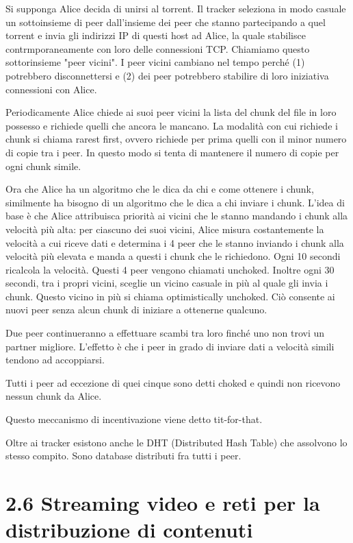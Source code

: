 \documentclass{book}
\begin{document}
Si supponga Alice decida di unirsi al torrent. Il tracker seleziona in modo casuale un sottoinsieme di peer dall'insieme dei peer che stanno partecipando a quel torrent e invia gli indirizzi IP di questi host ad Alice, la quale stabilisce contrmporaneamente con loro delle connessioni TCP. Chiamiamo questo sottorinsieme "peer vicini". I peer vicini cambiano nel tempo perché (1) potrebbero disconnettersi e (2) dei peer potrebbero stabilire di loro iniziativa connessioni con Alice.

Periodicamente Alice chiede ai suoi peer vicini la lista del chunk del file in loro possesso e richiede quelli che ancora le mancano. La modalità con cui richiede i chunk si chiama rarest first, ovvero richiede per prima quelli con il minor numero di copie tra i peer. In questo modo si tenta di mantenere il numero di copie per ogni chunk simile.

Ora che Alice ha un algoritmo che le dica da chi e come ottenere i chunk, similmente ha bisogno di un algoritmo che le dica a chi inviare i chunk. L'idea di base è che Alice attribuisca priorità ai vicini che le stanno mandando i chunk alla velocità più alta: per ciascuno dei suoi vicini, Alice misura costantemente la velocità a cui riceve dati e determina i 4 peer che le stanno inviando i chunk alla velocità più elevata e manda a questi i chunk che le richiedono. Ogni 10 secondi ricalcola la velocità. Questi 4 peer vengono chiamati unchoked. Inoltre ogni 30 secondi, tra i propri vicini, sceglie un vicino casuale in più al quale gli invia i chunk. Questo vicino in più si chiama optimistically unchoked. Ciò consente ai nuovi peer senza alcun chunk di iniziare a ottenerne qualcuno.

Due peer continueranno a effettuare scambi tra loro finché uno non trovi un partner migliore. L'effetto è che i peer in grado di inviare dati a velocità simili tendono ad accoppiarsi.

Tutti i peer ad eccezione di quei cinque sono detti choked e quindi non ricevono nessun chunk da Alice.

Questo meccanismo di incentivazione viene detto tit-for-that.

Oltre ai tracker esistono anche le DHT (Distributed Hash Table) che assolvono lo stesso compito. Sono database distributi fra tutti i peer.

\section*{2.6 Streaming video e reti per la distribuzione di contenuti}
\end{document}
